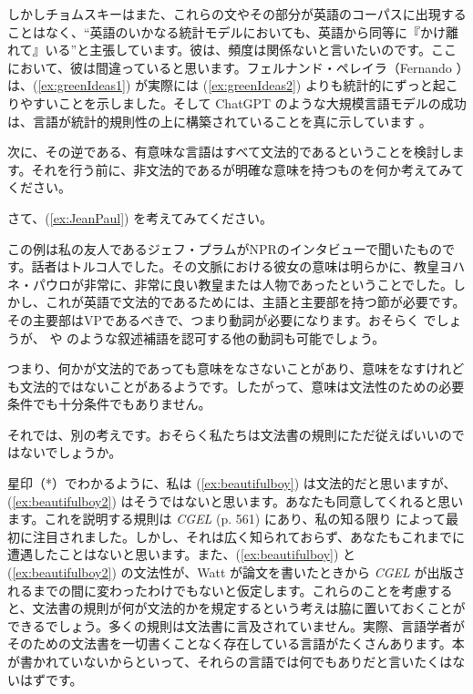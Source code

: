 しかしチョムスキーはまた、これらの文やその部分が英語のコーパスに出現することはなく、\enquote{英語のいかなる統計モデルにおいても、英語から同等に『かけ離れて』いる}と主張しています。彼は、頻度は関係ないと言いたいのです。ここにおいて、彼は間違っていると思います。フェルナンド・ペレイラ（Fernando \textcite{Pereira2000}）は、(\ref{ex:greenIdeas1}) が実際には (\ref{ex:greenIdeas2}) よりも統計的にずっと起こりやすいことを示しました。そして ChatGPT のような大規模言語モデルの成功は、言語が統計的規則性の上に構築されていることを真に示しています \citep{Kallini2024}。

次に、その逆である、有意味な言語はすべて文法的であるということを検討します。それを行う前に、非文法的であるが明確な意味を持つものを何か考えてみてください。

さて、(\ref{ex:JeanPaul}) を考えてみてください。

\label{ex:JeanPaul}
\z
この例は私の友人であるジェフ・プラムがNPRのインタビューで聞いたものです。話者はトルコ人でした。その文脈における彼女の意味は明らかに、教皇ヨハネ・パウロが非常に、非常に良い教皇または人物であったということでした。しかし、これが英語で文法的であるためには、主語と主要部を持つ節が必要です。その主要部はVPであるべきで、つまり動詞が必要になります。おそらく  でしょうが、 や  のような叙述補語を認可する他の動詞も可能でしょう。

つまり、何かが文法的であっても意味をなさないことがあり、意味をなすけれども文法的ではないことがあるようです。したがって、意味は文法性のための必要条件でも十分条件でもありません。

それでは、別の考えです。おそらく私たちは文法書の規則にただ従えばいいのではないでしょうか。

\ea
    \label{ex:beautifulboy}
    \label{ex:beautifulboy2}
    \z
\z
星印（*）でわかるように、私は (\ref{ex:beautifulboy}) は文法的だと思いますが、(\ref{ex:beautifulboy2}) はそうではないと思います。あなたも同意してくれると思います。これを説明する規則は \textit{CGEL} (p. 561) にあり、私の知る限り \textcite{Watt1968} によって最初に注目されました。しかし、それは広く知られておらず、あなたもこれまでに遭遇したことはないと思います。また、(\ref{ex:beautifulboy}) と (\ref{ex:beautifulboy2}) の文法性が、Watt が論文を書いたときから \textit{CGEL} が出版されるまでの間に変わったわけでもないと仮定します。これらのことを考慮すると、文法書の規則が何が文法的かを規定するという考えは脇に置いておくことができるでしょう。多くの規則は文法書に言及されていません。実際、言語学者がそのための文法書を一切書くことなく存在している言語がたくさんあります。本が書かれていないからといって、それらの言語では何でもありだと言いたくはないはずです。

